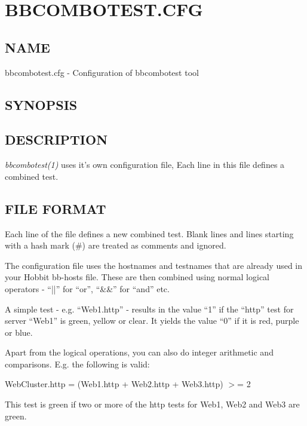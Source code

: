 %
\newpage
\section{BBCOMBOTEST.CFG}
\subsection{NAME}
 bbcombotest.cfg - Configuration of bbcombotest tool 

 
\subsection{SYNOPSIS}
\textbf{}


 
\subsection{DESCRIPTION}
\emph{bbcombotest(1)}
 uses it's own configuration file,  Each line in this file defines a combined test. 

 
\subsection{FILE FORMAT}
 Each line of the file defines a new combined test. Blank lines and
 lines starting with a hash mark (\#) are treated as comments and
 ignored. 


  The configuration file uses the hostnames and testnames that are
  already used in your Hobbit bb-hosts file. These are then combined
  using normal logical operators - ``||'' for ``or'', ``\&\&'' for
  ``and'' etc. 



  A simple test - e.g. ``Web1.http'' - results in the value ``1'' if
  the ``http'' test for server ``Web1'' is green, yellow or clear. It
  yields the value ``0'' if it is red, purple or blue. 



  Apart from the logical operations, you can also do integer
  arithmetic and comparisons. E.g. the following is valid: 



  WebCluster.http = (Web1.http + Web2.http + Web3.http) $>$= 2 


  This test is green if two or more of the http tests for Web1, Web2 and Web3 are green. 


